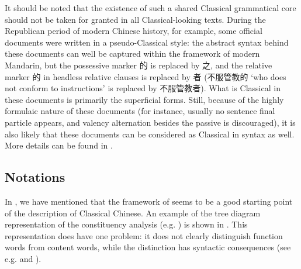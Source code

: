 \documentclass[UTF8, a4paper, oneside, scheme=plain, 12pt]{ctexrep}
\newcommand*{\citepage}[1]{p.~{#1}}
\newcommand{\translate}[1]{`#1'}
\begin{document}
It should be noted that the existence of such a shared Classical grammatical core should not be taken for granted in all Classical-looking texts.
During the Republican period of modern Chinese history, for example,
some official documents were written in a pseudo-Classical style:
the abstract syntax behind these documents can well be captured within the framework of modern Mandarin,
but the possessive marker 的 is replaced by 之,
and the relative marker 的 in headless relative clauses is replaced by 者 (不服管教的 \translate{who does not conform to instructions} is replaced by 不服管教者).
What is Classical in these documents is primarily the superficial forms.
Still, because of the highly formulaic nature of these documents (for instance, usually no sentence final particle appears, and valency alternation besides the passive is discouraged),
it is also likely that these documents can be considered as Classical in syntax as well.
More details can be found in .

\subsection{Notations}

In , we have mentioned that the framework of \citet{cgel} seems to be a good starting point of the description of Classical Chinese.
An example of the tree diagram representation of the constituency analysis (e.g. \citealt[\citepage{954} {[9]}]{cgel}) is shown in .
This representation does have one problem:
it does not clearly distinguish function words from content words,
while the distinction has syntactic consequences 
(see e.g.  and ).
\end{document}
